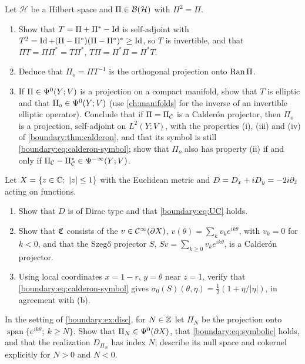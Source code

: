 \begin{exercise}\label{boundary:ex:orthogonal-calderon}
Let $\mathcal H$ be a Hilbert space and $\Pi\in\mathcal{B}(\mathcal H)$ with $\Pi^2=\Pi$.
\begin{enumerate}[label=(\alph*)]
\item Show that $T=\Pi+\Pi^*-\operatorname{Id}$ is self-adjoint with $T^2=\operatorname{Id}+(\Pi-\Pi^*)(\Pi-\Pi^*)^*
\ge\operatorname{Id}$, so $T$ is invertible, and that $\Pi T=\Pi\Pi^*=T\Pi^*$, $T\Pi=\Pi^*\Pi=\Pi^*T$.
\item Deduce that $\Pi_o=\Pi T^{-1}$ is the orthogonal projection onto $\operatorname{Ran}\Pi$.
\item If $\Pi\in\Psi^{0}(Y;V)$ is a projection on a compact manifold, show that $T$ is
elliptic and that $\Pi_o\in\Psi^{0}(Y;V)$ (use \cref{ch:manifolds} for the inverse of an
invertible elliptic operator). Conclude that if $\Pi=\Pi_{\mathcal{C}}$ is a Calder\'on projector, then
$\Pi_o$ is a projection, self-adjoint on $L^2(Y;V)$, with the properties (i), (iii) and (iv)
of \cref{boundary:thm:calderon}, and that its symbol is still
\eqref{boundary:eq:calderon-symbol}; show that $\Pi_o$ also has property (ii) if and only if
$\Pi_{\mathcal{C}}-\Pi_{\mathcal{C}}^*\in\Psi^{-\infty}(Y;V)$.
\end{enumerate}
\end{exercise}

\begin{exercise}\label{boundary:ex:disc}
Let $X=\{z\in\mathbb{C};\ |z|\le1\}$ with the Euclidean metric and $D=D_x+iD_y=-2i\partial_{\bar z}$
acting on functions.
\begin{enumerate}[label=(\alph*)]
\item Show that $D$ is of Dirac type and that \eqref{boundary:eq:UC} holds.
\item Show that $\mathfrak{C}$ consists of the $v\in\mathcal{C}^\infty(\partial X)$, $v(\theta)=\sum_kv_ke^{ik\theta}$,
with $v_k=0$ for $k<0$, and that the Szeg\H{o} projector $S$, $Sv=\sum_{k\ge0}v_ke^{ik\theta}$,
is a Calder\'on projector.
\item Using local coordinates $x=1-r$, $y=\theta$ near $z=1$, verify that
\eqref{boundary:eq:calderon-symbol} gives $\sigma_0(S)(\theta,\eta)=\frac12(1+\eta/|\eta|)$,
in agreement with (b).
\end{enumerate}
\end{exercise}

\begin{exercise}\label{boundary:ex:disc-index}
In the setting of \cref{boundary:ex:disc}, for $N\in\mathbb{Z}$ let $\Pi_N$ be the projection
onto $\operatorname{span}\{e^{ik\theta};\ k\ge N\}$. Show that $\Pi_N\in\Psi^{0}(\partial X)$,
that \eqref{boundary:eq:symbolic} holds, and that the realization $D_{\Pi_N}$ has index
$N$; describe its null space and cokernel explicitly for $N>0$ and $N<0$.
\end{exercise}

